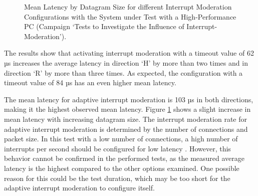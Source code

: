 \begin{figure}[h!]
  \centering
  \caption{Mean Latency by Datagram Size for different Interrupt Moderation Configurations with the System under Test with a High-Performance PC (Campaign `Tests to Investigate the Influence of Interrupt-Moderation').}
  \label{fig:IMean}
\end{figure}

The results show that activating interrupt moderation with a timeout value of 62 µs increases the average latency in direction `H' by more than two times and in direction `R' by more than three times. As expected, the configuration with a timeout value of 84 µs has an even higher mean latency.

The mean latency for adaptive interrupt moderation is 103 µs in both directions, making it the highest observed mean latency. Figure \ref{fig:IMean} shows a slight increase in mean latency with increasing datagram size. The interrupt moderation rate for adaptive interrupt moderation is determined by the number of connections and packet size. In this test with a low number of connections, a high number of interrupts per second should be configured for low latency \cite{intermod04}. However, this behavior cannot be confirmed in the performed tests, as the measured average latency is the highest compared to the other options examined. One possible reason for this could be the test duration, which may be too short for the adaptive interrupt moderation to configure itself.

